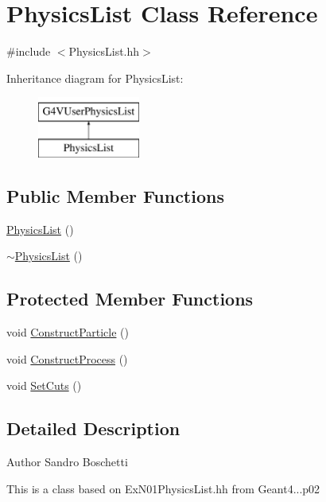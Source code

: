 \hypertarget{class_physics_list}{\section{Physics\-List Class Reference}
\label{class_physics_list}
}


{\ttfamily \#include $<$Physics\-List.\-hh$>$}

Inheritance diagram for Physics\-List\-:\begin{figure}[H]
\begin{center}
\leavevmode
\includegraphics[height=2.000000cm]{class_physics_list}
\end{center}
\end{figure}
\subsection*{Public Member Functions}
\begin{DoxyCompactItemize}
\item 
\hyperlink{class_physics_list_aeecf835245a0b10c24e5e6c37cbb0dab}{Physics\-List} ()
\item 
\hyperlink{class_physics_list_a6cff761e006f8d5c57f0beca0e7d61ae}{$\sim$\-Physics\-List} ()
\end{DoxyCompactItemize}
\subsection*{Protected Member Functions}
\begin{DoxyCompactItemize}
\item 
void \hyperlink{class_physics_list_af7906507122c985d2da3e61c56efe60e}{Construct\-Particle} ()
\item 
void \hyperlink{class_physics_list_a9c08bc28eba2ae62104b967280901a3f}{Construct\-Process} ()
\item 
void \hyperlink{class_physics_list_a0ba901b82ae30657b109930645fe8017}{Set\-Cuts} ()
\end{DoxyCompactItemize}


\subsection{Detailed Description}
\begin{DoxyAuthor}{Author}
Sandro Boschetti
\end{DoxyAuthor}
This is a class based on Ex\-N01\-Physics\-List.\-hh from Geant4...\-p02 

